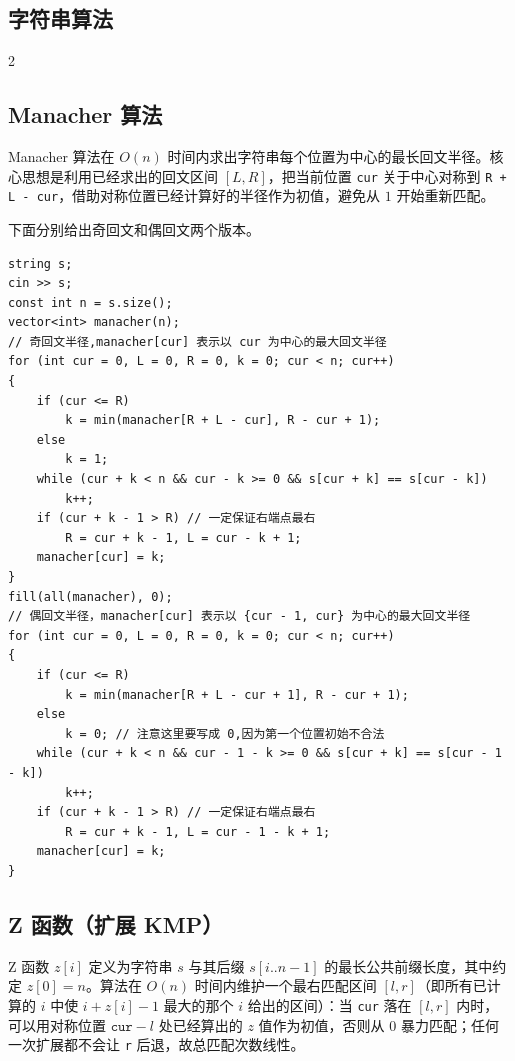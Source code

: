 	\begin{center}
		\section{字符串算法}
	\end{center}

	\begin{multicols*}{2}

		\subsection{Manacher 算法}

		Manacher 算法在 $O(n)$ 时间内求出字符串每个位置为中心的最长回文半径。核心思想是利用已经求出的回文区间 $[L, R]$，把当前位置 \texttt{cur} 关于中心对称到 \texttt{R + L - cur}，借助对称位置已经计算好的半径作为初值，避免从 $1$ 开始重新匹配。

		下面分别给出奇回文和偶回文两个版本。

		\begin{verbatim}
string s;
cin >> s;
const int n = s.size();
vector<int> manacher(n);
// 奇回文半径,manacher[cur] 表示以 cur 为中心的最大回文半径
for (int cur = 0, L = 0, R = 0, k = 0; cur < n; cur++)
{
	if (cur <= R)
		k = min(manacher[R + L - cur], R - cur + 1);
	else
		k = 1;
	while (cur + k < n && cur - k >= 0 && s[cur + k] == s[cur - k])
		k++;
	if (cur + k - 1 > R) // 一定保证右端点最右
		R = cur + k - 1, L = cur - k + 1;
	manacher[cur] = k;
}
fill(all(manacher), 0);
// 偶回文半径，manacher[cur] 表示以 {cur - 1, cur} 为中心的最大回文半径
for (int cur = 0, L = 0, R = 0, k = 0; cur < n; cur++)
{
	if (cur <= R)
		k = min(manacher[R + L - cur + 1], R - cur + 1);
	else
		k = 0; // 注意这里要写成 0,因为第一个位置初始不合法
	while (cur + k < n && cur - 1 - k >= 0 && s[cur + k] == s[cur - 1 - k])
		k++;
	if (cur + k - 1 > R) // 一定保证右端点最右
		R = cur + k - 1, L = cur - 1 - k + 1;
	manacher[cur] = k;
}
		\end{verbatim}

		\subsection{Z 函数（扩展 KMP）}

		Z 函数 $z[i]$ 定义为字符串 $s$ 与其后缀 $s[i..n-1]$ 的最长公共前缀长度，其中约定 $z[0] = n$。算法在 $O(n)$ 时间内维护一个最右匹配区间 $[l, r]$（即所有已计算的 $i$ 中使 $i + z[i] - 1$ 最大的那个 $i$ 给出的区间）：当 \texttt{cur} 落在 $[l, r]$ 内时，可以用对称位置 $\texttt{cur} - l$ 处已经算出的 $z$ 值作为初值，否则从 $0$ 暴力匹配；任何一次扩展都不会让 \texttt{r} 后退，故总匹配次数线性。


\end{multicols*}
